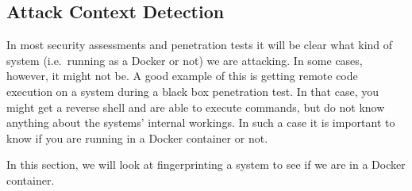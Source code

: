 \subsection{Attack Context Detection}
In most security assessments and penetration tests it will be clear what kind of system (i.e.\ running as a Docker or not) we are attacking. In some cases, however, it might not be. A good example of this is getting remote code execution on a system during a black box penetration test. In that case, you might get a reverse shell and are able to execute commands, but do not know anything about the systems' internal workings. In such a case it is important to know if you are running in a Docker container or not.

In this section, we will look at fingerprinting a system to see if we are in a Docker container.





